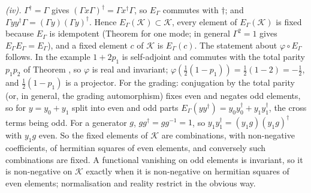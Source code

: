 \emph{(iv).} $\Gamma^{\dagger} = \Gamma$ gives $(\Gamma x\Gamma)^{\dagger} = \Gamma x^{\dagger}\Gamma$, so $E_{\Gamma}$ commutes with $\dagger$; and $\Gamma yy^{\dagger}\Gamma = (\Gamma y)(\Gamma y)^{\dagger}$. Hence $E_{\Gamma}(\mathcal{K}) \subset \mathcal{K}$, every element of $E_{\Gamma}(\mathcal{K})$ is fixed because $E_{\Gamma}$ is idempotent (Theorem  for one mode; in general $\Gamma^{2} = 1$ gives $E_{\Gamma}E_{\Gamma} = E_{\Gamma}$), and a fixed element $c$ of $\mathcal{K}$ is $E_{\Gamma}(c)$. The statement about $\varphi \circ E_{\Gamma}$ follows. In the example $1 + 2p_{1}$ is self-adjoint and commutes with the total parity $p_{1}p_{2}$ of Theorem , so $\varphi$ is real and invariant; $\varphi(\tfrac12(1 - p_{1})) = \tfrac12(1 - 2) = -\tfrac12$, and $\tfrac12(1 - p_{1})$ is a projector. For the grading: conjugation by the total parity (or, in general, the grading automorphism) fixes even and negates odd elements, so for $y = y_{0} + y_{1}$ split into even and odd parts $E_{\Gamma}(yy^{\dagger}) = y_{0}y_{0}^{\dagger} + y_{1}y_{1}^{\dagger}$, the cross terms being odd. For a generator $g$, $gg^{\dagger} = gg^{-1} = 1$, so $y_{1}y_{1}^{\dagger} = (y_{1}g)(y_{1}g)^{\dagger}$ with $y_{1}g$ even. So the fixed elements of $\mathcal{K}$ are combinations, with non-negative coefficients, of hermitian squares of even elements, and conversely such combinations are fixed. A functional vanishing on odd elements is invariant, so it is non-negative on $\mathcal{K}$ exactly when it is non-negative on hermitian squares of even elements; normalisation and reality restrict in the obvious way.

